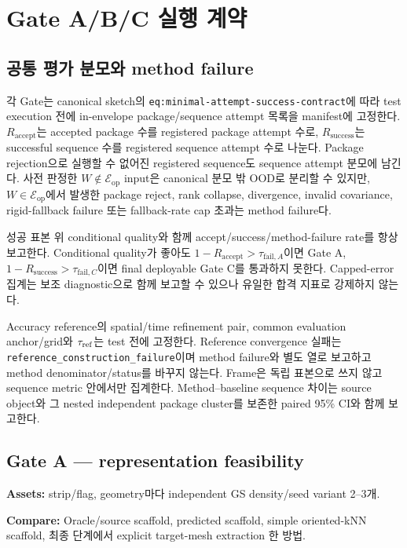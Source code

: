 \documentclass[10pt]{article}
\newcommand{\code}[1]{{\small\nolinkurl{#1}}}
\newcommand{\must}[1]{\textcolor{CoreBlue}{\textbf{#1}}}
\begin{document}
\section{Gate A/B/C 실행 계약}

\subsection{공통 평가 분모와 method failure}

각 Gate는 canonical sketch의
\code{eq:minimal-attempt-success-contract}에 따라 test execution 전에
in-envelope package/sequence attempt 목록을 manifest에 고정한다.
\(R_{\mathrm{accept}}\)는 accepted package 수를 registered package attempt 수로,
\(R_{\mathrm{success}}\)는 successful sequence 수를 registered sequence attempt 수로 나눈다.
Package rejection으로 실행할 수 없어진 registered sequence도 sequence attempt 분모에 남긴다.
사전 판정한 \(W\notin\mathcal E_{\mathrm{op}}\) input은 canonical 분모 밖 OOD로 분리할 수 있지만,
\(W\in\mathcal E_{\mathrm{op}}\)에서 발생한 package reject, rank collapse, divergence,
invalid covariance, rigid-fallback failure 또는 fallback-rate cap 초과는 method failure다.

성공 표본 위 conditional quality와 함께 accept/success/method-failure rate를 항상 보고한다.
Conditional quality가 좋아도 \(1-R_{\mathrm{accept}}>\tau_{\mathrm{fail},A}\)이면 Gate A,
\(1-R_{\mathrm{success}}>\tau_{\mathrm{fail},C}\)이면 final deployable Gate C를 통과하지 못한다.
Capped-error 집계는 보조 diagnostic으로 함께 보고할 수 있으나 유일한 합격 지표로 강제하지 않는다.

Accuracy reference의 spatial/time refinement pair, common evaluation anchor/grid와
\(\tau_{\rm ref}\)는 test 전에 고정한다. Reference convergence 실패는
\code{reference\_construction\_failure}이며 method failure와 별도 열로 보고하고
method denominator/status를 바꾸지 않는다.
Frame은 독립 표본으로 쓰지 않고 sequence metric 안에서만 집계한다.
Method--baseline sequence 차이는 source object와 그 nested independent package cluster를 보존한
paired 95\% CI와
함께 보고한다.

\subsection{Gate A --- representation feasibility}

\must{Assets:} strip/flag, geometry마다 independent GS density/seed variant 2--3개.

\must{Compare:} Oracle/source scaffold, predicted scaffold, simple oriented-kNN scaffold,
최종 단계에서 explicit target-mesh extraction 한 방법.
\end{document}
